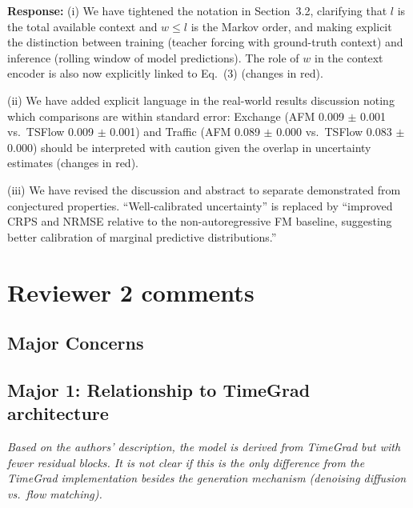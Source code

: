 \documentclass[11pt]{article}
\newcommand{\reviewertext}[1]{%
  \begin{reviewerquote}
    {\color{reviewercolor}\itshape #1}
  \end{reviewerquote}%
}
\newcommand{\authorresponse}[1]{%
  \textbf{Response:} #1\par\medskip
}
\begin{document}
\authorresponse{%
(i) We have tightened the notation in Section~3.2, clarifying that $l$ is the total available context and $w \le l$ is the Markov order, and making explicit the distinction between training (teacher forcing with ground-truth context) and inference (rolling window of model predictions). The role of $w$ in the context encoder is also now explicitly linked to Eq.~(3) (changes in red).

(ii) We have added explicit language in the real-world results discussion noting which comparisons are within standard error: Exchange (AFM 0.009 $\pm$ 0.001 vs.\ TSFlow 0.009 $\pm$ 0.001) and Traffic (AFM 0.089 $\pm$ 0.000 vs.\ TSFlow 0.083 $\pm$ 0.000) should be interpreted with caution given the overlap in uncertainty estimates (changes in red).

(iii) We have revised the discussion and abstract to separate demonstrated from conjectured properties. ``Well-calibrated uncertainty'' is replaced by ``improved CRPS and NRMSE relative to the non-autoregressive FM baseline, suggesting better calibration of marginal predictive distributions.''

}


\section{Reviewer 2 comments}

\subsection{Major Concerns}

\subsection{Major 1: Relationship to TimeGrad architecture}

\reviewertext{%
Based on the authors' description, the model is derived from TimeGrad but with fewer residual blocks. It is not clear if this is the only difference from the TimeGrad implementation besides the generation mechanism (denoising diffusion vs.\ flow matching).
}
\end{document}
